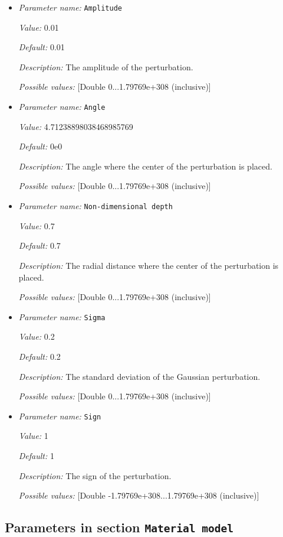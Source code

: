 \begin{itemize}
\item {\it Parameter name:} {\tt Amplitude}


{\it Value:} 0.01


{\it Default:} 0.01


{\it Description:} The amplitude of the perturbation.


{\it Possible values:} [Double 0...1.79769e+308 (inclusive)]
\item {\it Parameter name:} {\tt Angle}


{\it Value:} 4.71238898038468985769


{\it Default:} 0e0


{\it Description:} The angle where the center of the perturbation is placed.


{\it Possible values:} [Double 0...1.79769e+308 (inclusive)]
\item {\it Parameter name:} {\tt Non-dimensional depth}


{\it Value:} 0.7


{\it Default:} 0.7


{\it Description:} The radial distance where the center of the perturbation is placed.


{\it Possible values:} [Double 0...1.79769e+308 (inclusive)]
\item {\it Parameter name:} {\tt Sigma}


{\it Value:} 0.2


{\it Default:} 0.2


{\it Description:} The standard deviation of the Gaussian perturbation.


{\it Possible values:} [Double 0...1.79769e+308 (inclusive)]
\item {\it Parameter name:} {\tt Sign}


{\it Value:} 1


{\it Default:} 1


{\it Description:} The sign of the perturbation.


{\it Possible values:} [Double -1.79769e+308...1.79769e+308 (inclusive)]
\end{itemize}

\subsection{Parameters in section \tt Material model}

